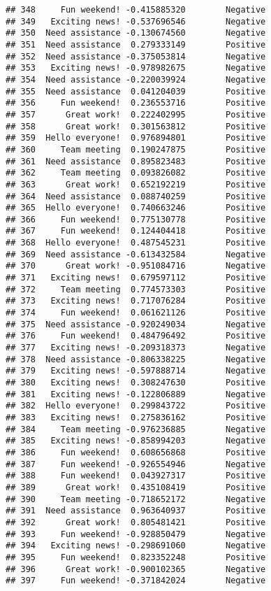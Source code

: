 \documentclass[
]{article}
\begin{document}
\begin{verbatim}
## 348     Fun weekend! -0.415885320        Negative
## 349   Exciting news! -0.537696546        Negative
## 350  Need assistance -0.130674560        Negative
## 351  Need assistance  0.279333149        Positive
## 352  Need assistance -0.375053814        Negative
## 353   Exciting news! -0.978982675        Negative
## 354  Need assistance -0.220039924        Negative
## 355  Need assistance  0.041204039        Positive
## 356     Fun weekend!  0.236553716        Positive
## 357      Great work!  0.222402995        Positive
## 358      Great work!  0.301563812        Positive
## 359  Hello everyone!  0.976894801        Positive
## 360     Team meeting  0.190247875        Positive
## 361  Need assistance  0.895823483        Positive
## 362     Team meeting  0.093826082        Positive
## 363      Great work!  0.652192219        Positive
## 364  Need assistance  0.088740259        Positive
## 365  Hello everyone!  0.740663246        Positive
## 366     Fun weekend!  0.775130778        Positive
## 367     Fun weekend!  0.124404418        Positive
## 368  Hello everyone!  0.487545231        Positive
## 369  Need assistance -0.613432584        Negative
## 370      Great work! -0.951084716        Negative
## 371   Exciting news!  0.679597112        Positive
## 372     Team meeting  0.774573303        Positive
## 373   Exciting news!  0.717076284        Positive
## 374     Fun weekend!  0.061621126        Positive
## 375  Need assistance -0.920249034        Negative
## 376     Fun weekend!  0.484796492        Positive
## 377   Exciting news! -0.209318373        Negative
## 378  Need assistance -0.806338225        Negative
## 379   Exciting news! -0.597888714        Negative
## 380   Exciting news!  0.308247630        Positive
## 381   Exciting news! -0.122806889        Negative
## 382  Hello everyone!  0.299843722        Positive
## 383   Exciting news!  0.275836162        Positive
## 384     Team meeting -0.976236885        Negative
## 385   Exciting news! -0.858994203        Negative
## 386     Fun weekend!  0.608656868        Positive
## 387     Fun weekend! -0.926554946        Negative
## 388     Fun weekend!  0.043927317        Positive
## 389      Great work!  0.435108419        Positive
## 390     Team meeting -0.718652172        Negative
## 391  Need assistance  0.963640937        Positive
## 392      Great work!  0.805481421        Positive
## 393     Fun weekend! -0.928850479        Negative
## 394   Exciting news! -0.298691060        Negative
## 395     Fun weekend!  0.823352248        Positive
## 396      Great work! -0.900102365        Negative
## 397     Fun weekend! -0.371842024        Negative

\end{verbatim}
\end{document}
